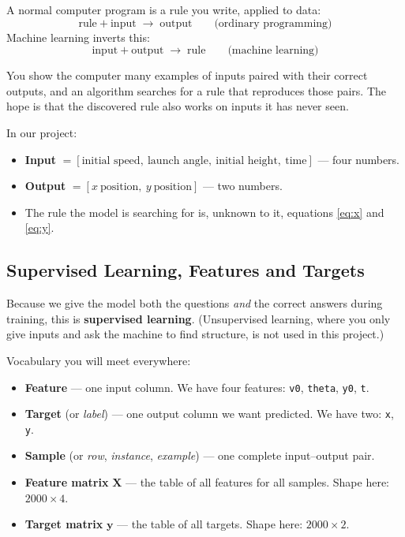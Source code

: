 \documentclass[11pt,a4paper]{article}
\begin{document}
A normal computer program is a rule you write, applied to data:
\[
  \text{rule} + \text{input} \;\longrightarrow\; \text{output}
  \qquad\text{(ordinary programming)}
\]
Machine learning inverts this:
\[
  \text{input} + \text{output} \;\longrightarrow\; \text{rule}
  \qquad\text{(machine learning)}
\]

You show the computer many examples of inputs paired with their correct outputs, and an algorithm
searches for a rule that reproduces those pairs. The hope is that the discovered rule also works on
inputs it has never seen.

In our project:
\begin{itemize}[leftmargin=2em,itemsep=0.1em]
  \item \textbf{Input} $=[\text{initial speed},\ \text{launch angle},\ \text{initial height},\
        \text{time}]$ --- four numbers.
  \item \textbf{Output} $=[x\ \text{position},\ y\ \text{position}]$ --- two numbers.
  \item The rule the model is searching for is, unknown to it, equations \eqref{eq:x}
        and \eqref{eq:y}.
\end{itemize}

\subsection{Supervised Learning, Features and Targets}\label{sec:features}

Because we give the model both the questions \emph{and} the correct answers during training, this
is \textbf{supervised learning}. (Unsupervised learning, where you only give inputs and ask the
machine to find structure, is not used in this project.)

Vocabulary you will meet everywhere:

\begin{itemize}[leftmargin=2em,itemsep=0.15em]
  \item \textbf{Feature} --- one input column. We have four features:
        \texttt{v0}, \texttt{theta}, \texttt{y0}, \texttt{t}.
  \item \textbf{Target} (or \emph{label}) --- one output column we want predicted. We have two:
        \texttt{x}, \texttt{y}.
  \item \textbf{Sample} (or \emph{row}, \emph{instance}, \emph{example}) --- one complete
        input--output pair.
  \item \textbf{Feature matrix} $\mathbf{X}$ --- the table of all features for all samples.
        Shape here: $2000\times4$.
  \item \textbf{Target matrix} $\mathbf{y}$ --- the table of all targets. Shape here: $2000\times2$.
\end{itemize}
\end{document}
